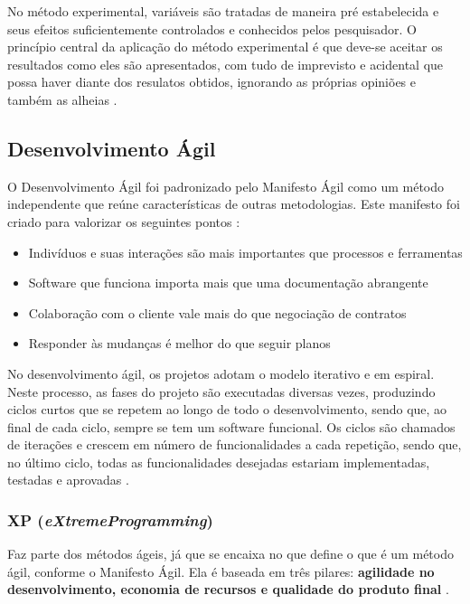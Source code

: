 No método experimental, variáveis são tratadas de maneira pré estabelecida e seus efeitos suficientemente controlados  e conhecidos pelos pesquisador. O princípio central da aplicação do método experimental é que deve-se aceitar os resultados como eles são apresentados, com tudo de imprevisto e acidental que possa haver diante dos resulatos obtidos, ignorando as próprias opiniões e também as alheias \cite{fachin-metodos}.

\subsection{Desenvolvimento Ágil}\label{subsec:devagil}
O Desenvolvimento Ágil foi padronizado pelo Manifesto Ágil como um método independente que reúne características de outras metodologias. Este manifesto foi criado para valorizar os seguintes pontos \cite{dev-agil}:

\begin{itemize}
	\item Indivíduos e suas interações são mais importantes que processos e ferramentas
	\item Software que funciona importa mais que uma documentação abrangente
	\item Colaboração com o cliente vale mais do que negociação de contratos
	\item Responder às mudanças é melhor do que seguir planos
\end{itemize}

No desenvolvimento ágil, os projetos adotam o modelo iterativo e em espiral. Neste processo, as fases do projeto são executadas diversas vezes, produzindo ciclos curtos que se repetem ao longo de todo o desenvolvimento, sendo que, ao final de cada ciclo, sempre se tem um software funcional. Os ciclos são chamados de iterações e crescem em número de funcionalidades a cada repetição, sendo que, no último ciclo, todas as funcionalidades desejadas estariam implementadas, testadas e aprovadas \cite{dev-agil2}.

\subsubsection{XP (\textit{eXtremeProgramming})}

Faz parte dos métodos ágeis, já que se encaixa no que define o que é um método ágil, conforme o Manifesto Ágil. Ela é baseada em três pilares: \textbf{agilidade no desenvolvimento, economia de recursos e qualidade do produto final} \cite{dev-agil2}.

